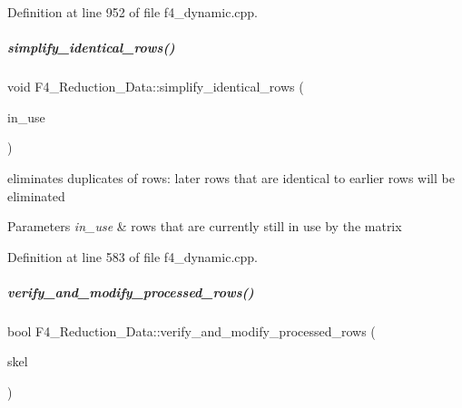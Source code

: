 Definition at line 952 of file f4\+\_\+dynamic.\+cpp.

\mbox{\label{group___g_b_computation_aa550a298a15a8baac59ced268331dc68}} 
\subparagraph{\texorpdfstring{simplify\+\_\+identical\+\_\+rows()}{simplify\_identical\_rows()}}
{\footnotesize\ttfamily void F4\+\_\+\+Reduction\+\_\+\+Data\+::simplify\+\_\+identical\+\_\+rows (\begin{DoxyParamCaption}\item[{set$<$ unsigned $>$ \&}]{in\+\_\+use }\end{DoxyParamCaption})}



eliminates duplicates of rows\+: later rows that are identical to earlier rows will be eliminated 


\begin{DoxyParams}{Parameters}
{\em in\+\_\+use} & rows that are currently still in use by the matrix \\
\hline
\end{DoxyParams}


Definition at line 583 of file f4\+\_\+dynamic.\+cpp.

\mbox{\label{group___g_b_computation_ad9808f644164e01195a2bcca7c3ca787}} 
\subparagraph{\texorpdfstring{verify\+\_\+and\+\_\+modify\+\_\+processed\+\_\+rows()}{verify\_and\_modify\_processed\_rows()}}
{\footnotesize\ttfamily bool F4\+\_\+\+Reduction\+\_\+\+Data\+::verify\+\_\+and\+\_\+modify\+\_\+processed\+\_\+rows (\begin{DoxyParamCaption}\item[{\hyperlink{group___c_l_s_solvers_class_l_p___solvers_1_1_l_p___solver}{L\+P\+\_\+\+Solver} $\ast$}]{skel }\end{DoxyParamCaption})}



